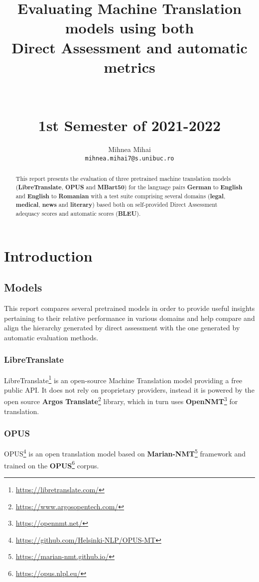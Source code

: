 \documentclass[11pt]{article}
\title{Evaluating Machine Translation models using both \\
	 Direct Assessment and automatic metrics \\
		\hfill \\
		\hfill \\
		\small{1st Semester of 2021-2022}}
\author{Mihnea Mihai \\
  \texttt{mihnea.mihai7@s.unibuc.ro} }
\begin{document}
\maketitle
\begin{abstract}
This report presents the evaluation of three pretrained machine translation models
(\textbf{LibreTranslate}, \textbf{OPUS} and \textbf{MBart50})
for the language pairs \textbf{German} to \textbf{English} and \textbf{English} to \textbf{Romanian}
with a test suite comprising several domains
(\textbf{legal}, \textbf{medical}, \textbf{news} and \textbf{literary})
based both on self-provided Direct Assessment adequacy scores and
automatic scores (\textbf{BLEU}).
\end{abstract}

\section{Introduction}
\label{section:intro}

\subsection{Models}

This report compares several pretrained models in order to provide useful insights
pertaining to their relative performance in various domains
and help compare and align the hierarchy generated by direct assessment
with the one generated by automatic evaluation methods.

\subsubsection{LibreTranslate}

LibreTranslate\footnote{\url{https://libretranslate.com/}}
is an open-source Machine Translation model providing a free public API.
It does not rely on proprietary providers,
instead it is powered by the open source
\textbf{Argos Translate}\footnote{\url{https://www.argosopentech.com/}} library,
which in turn uses \textbf{OpenNMT}\footnote{\url{https://opennmt.net/}}
\citep{klein-etal-2017-opennmt} for translation.

\subsubsection{OPUS}
OPUS\footnote{\url{https://github.com/Helsinki-NLP/OPUS-MT}}
\citep{tiedemann-thottingal-2020-opus} is an open translation model based on
\textbf{Marian-NMT}\footnote{\url{https://marian-nmt.github.io/}} \citep{mariannmt}
framework and trained on the \textbf{OPUS}\footnote{\url{https://opus.nlpl.eu/}} corpus.
\end{document}
